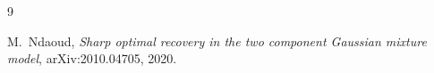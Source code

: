 \documentclass[11pt, a4paper]{article}
\begin{document}
\begin{thebibliography}{9}

  M.~Ndaoud,
  \textit{Sharp optimal recovery in the two component Gaussian mixture model},
  arXiv:2010.04705, 2020.

\end{thebibliography}
\end{document}
